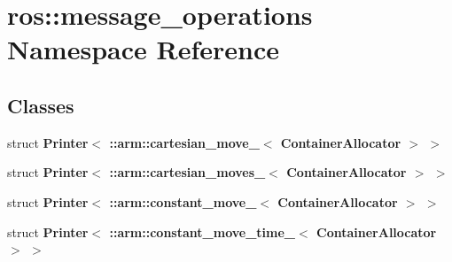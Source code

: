 \section{ros\-:\-:message\-\_\-operations \-Namespace \-Reference}
\label{namespaceros_1_1message__operations}
\subsection*{\-Classes}
\begin{DoxyCompactItemize}
\item 
struct {\bf \-Printer$<$ \-::arm\-::cartesian\-\_\-move\-\_\-$<$ Container\-Allocator $>$ $>$}
\item 
struct {\bf \-Printer$<$ \-::arm\-::cartesian\-\_\-moves\-\_\-$<$ Container\-Allocator $>$ $>$}
\item 
struct {\bf \-Printer$<$ \-::arm\-::constant\-\_\-move\-\_\-$<$ Container\-Allocator $>$ $>$}
\item 
struct {\bf \-Printer$<$ \-::arm\-::constant\-\_\-move\-\_\-time\-\_\-$<$ Container\-Allocator $>$ $>$}
\end{DoxyCompactItemize}
